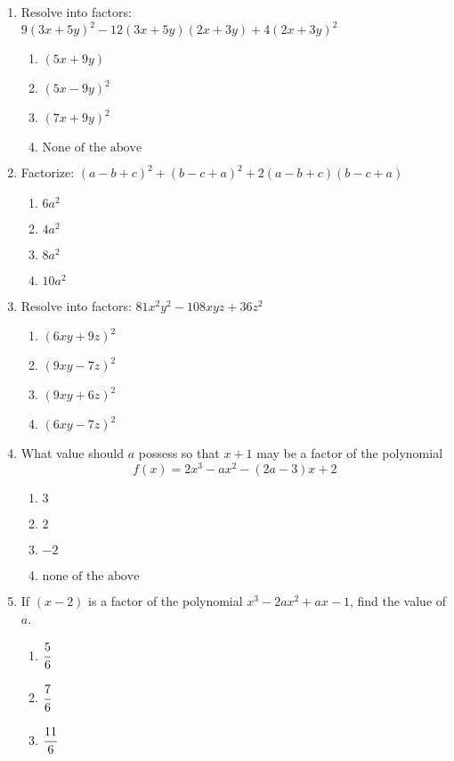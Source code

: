 \begin{multicols}{2}
\begin{enumerate}[label={\arabic*.}]
\begin{enumerate}[label={\Alph*.}]
      \end{enumerate}
    \item Resolve into factors: $9(3x + 5y)^2 - 12(3x + 5y)(2x + 3y) + 4(2x + 3y)^2$
      \begin{enumerate}[label={\Alph*.}]
        \item \((5x + 9y)\)
        \item \({(5x - 9y)}^2\)
        \item \({(7x + 9y)}^2\)
        \item \(\text{None of the above}\)
      \end{enumerate}
    \item Factorize: $(a-b+c)^2 + (b-c+a)^2 + 2(a -b +c)(b-c+a)$
      \begin{enumerate}[label={\Alph*.}]
        \item \(6a^2\)
        \item \(4a^2\)
        \item \(8a^2\)
        \item \(10a^2\)
      \end{enumerate}
    \item Resolve into factors: $81x^2y^2 - 108xyz + 36z^2$
      \begin{enumerate}[label={\Alph*.}]
        \item \({(6xy + 9z)}^2\)
        \item \({(9xy - 7z)}^2\)
        \item \({(9xy + 6z)}^2\)
        \item \({(6xy - 7z)}^2\)
      \end{enumerate}
    \item What value should $a$ possess so that $x+1$ may be a factor of the polynomial \[f(x) = 2x^3 - ax^2 - (2a -3)x + 2\]
      \begin{enumerate}[label={\Alph*.}]
        \item \(3\)
        \item \(2\)
        \item \(-2\)
        \item \(\text{none of the above}\)
      \end{enumerate}
    \item If $(x-2)$ is a factor of the polynomial $x^3 - 2ax^2 +ax -1$, find the value of \(a\).
      \begin{enumerate}[label={\Alph*.}]
        \item \(\cfrac{5}{6}\)
        \item \(\cfrac{7}{6}\)
        \item \(\cfrac{11}{6}\)

\end{enumerate}
\end{enumerate}
\end{multicols}
